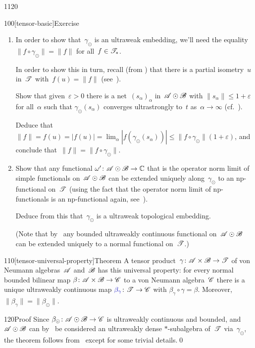 \begin{parsec}{1120}
\begin{point}{100}[tensor-basic]{Exercise}
\begin{enumerate}
\item
In order to show that~$\gamma_\odot$ is an ultraweak embedding,
we'll need the equality $\|f\circ \gamma_\odot\|=\|f\|$
for all~$f\in\mathscr{T}_*$.

In order to show this in turn,
recall 
(from )
that there is a partial isometry~$u$ in~$\mathscr{T}$
with~$f(u)=\|f\|$ (see~). 

Show that given~$\varepsilon>0$ 
there is a net~$(s_\alpha)_\alpha$
in~$\mathscr{A}\odot\mathscr{B}$
with $\|s_\alpha\|\leq 1+\varepsilon$ for all~$\alpha$
such that $\gamma_\odot(s_\alpha)$
converges ultrastrongly to~$t$ as~$\alpha\to\infty$
(cf.~).

Deduce that $\|f\|=f(u)=\left|f(u)\right|
=\lim_\alpha \left|f(\gamma_\odot(s_\alpha))\right|
\leq \|f\circ \gamma_\odot\| (1+\varepsilon)$,
and
conclude that~$\|f\|=\|f\circ\gamma_\odot\|$.

\item
Show that any functional $\omega'\colon \mathscr{A}\odot\mathscr{B}\to\mathbb{C}$
that is the operator norm limit of simple functionals
on~$\mathscr{A}\odot\mathscr{B}$
can be extended uniquely along~$\gamma_\odot$
to an np-functional on~$\mathscr{T}$
(using the fact that the operator
norm limit of np-functionals is an np-functional again,
see~).

Deduce from this that~$\gamma_\odot$ is a ultraweak topological embedding.

(Note that by~ any 
bounded ultraweakly continuous functional
on~$\mathscr{A}\odot\mathscr{B}$ can be extended uniquely
to a normal functional on~$\mathscr{T}$.)
\end{enumerate}
\spacingfix%
\end{point}
\begin{point}{110}[tensor-universal-property]{Theorem}%
A tensor product~$\gamma\colon \mathscr{A}\times\mathscr{B}\to\mathscr{T}$
of von Neumann algebras~$\mathscr{A}$ and~$\mathscr{B}$
has this universal property:
for every normal bounded bilinear map $\beta\colon \mathscr{A}\times \mathscr{B}\to\mathscr{C}$
to a von Neumann algebra~$\mathscr{C}$
there is a unique ultraweakly continuous
map  $\Define{\beta_\gamma}\colon \scrT
\to \scrC$%
with $\beta_\gamma\circ \gamma  = \beta$.
Moreover, $\|\beta_\gamma\|=\|\beta_\odot\|$.
\begin{point}{120}{Proof}%
Since $\beta_\odot\colon \mathscr{A}\odot\mathscr{B}\to\mathscr{C}$
is ultraweakly continuous and bounded,
and
$\mathscr{A}\odot\mathscr{B}$
can by~ be
considered an ultraweakly dense $*$-subalgebra
of~$\mathscr{T}$ via~$\gamma_\odot$,
the theorem follows from~
except for some trivial details.\qed
\end{point}
\end{point}
\end{parsec}%
